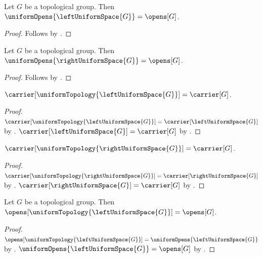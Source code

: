 \begin{theorem}\label{left_uniform_space_opens}
    Let $G$ be a topological group.
    Then $\uniformOpens{\leftUniformSpace{G}}=\opens[G]$.
\end{theorem}
\begin{proof}
    Follows by
        .
\end{proof}

\begin{theorem}\label{right_uniform_space_opens}
    Let $G$ be a topological group.
    Then $\uniformOpens{\rightUniformSpace{G}}=\opens[G]$.
\end{theorem}
\begin{proof}
    Follows by
        .
\end{proof}

\begin{proposition}\label{left_uniform_topology_carrier}
    $\carrier[\uniformTopology{\leftUniformSpace{G}}]=\carrier[G]$.
\end{proposition}
\begin{proof}
    $\carrier[\uniformTopology{\leftUniformSpace{G}}]
        =\carrier[\leftUniformSpace{G}]$
        by .
    $\carrier[\leftUniformSpace{G}]=\carrier[G]$
        by .
\end{proof}

\begin{proposition}\label{right_uniform_topology_carrier}
    $\carrier[\uniformTopology{\rightUniformSpace{G}}]=\carrier[G]$.
\end{proposition}
\begin{proof}
    $\carrier[\uniformTopology{\rightUniformSpace{G}}]
        =\carrier[\rightUniformSpace{G}]$
        by .
    $\carrier[\rightUniformSpace{G}]=\carrier[G]$
        by .
\end{proof}

\begin{theorem}\label{left_uniform_topology_opens}
    Let $G$ be a topological group.
    Then $\opens[\uniformTopology{\leftUniformSpace{G}}]=\opens[G]$.
\end{theorem}
\begin{proof}
    $\opens[\uniformTopology{\leftUniformSpace{G}}]
        =\uniformOpens{\leftUniformSpace{G}}$
        by .
    $\uniformOpens{\leftUniformSpace{G}}=\opens[G]$
        by .
\end{proof}

